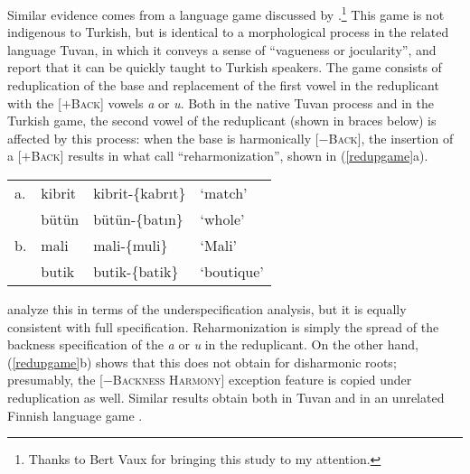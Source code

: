 Similar evidence comes from a language game discussed by \citet{Harrison2001}.\footnote{Thanks to Bert Vaux for bringing this study to my attention.} This game is not indigenous to Turkish, but is identical to a morphological process in the related language Tuvan, in which it conveys a sense of ``vagueness or jocularity'', and \citeauthor{Harrison2001} report that it can be quickly taught to Turkish speakers. The game consists of reduplication of the base and replacement of the first vowel in the reduplicant with the [$+$\textsc{Back}] vowels \emph{a} or \emph{u}. Both in the native Tuvan process and in the Turkish game, the second vowel of the reduplicant (shown in braces below) is affected by this process: when the base is harmonically [$-$\textsc{Back}], the insertion of a [$+$\textsc{Back}] results in what \citeauthor{Harrison2001} call ``reharmonization'', shown in  (\ref{redupgame}a).

\begin{example} \label{redupgame}
\begin{tabular}{l l l l}
a. & {kibrit} & {kibrit}-\{{kabrıt}\} & `match'    \\
   & {bütün}  & {bütün}-\{{batın}\}   & `whole'    \\
b. & {mali}   & {mali}-\{{muli}\}     & `Mali'     \\
   & {butik}  & {butik}-\{{batik}\}   & `boutique' \\
\end{tabular}
\end{example}

\noindent \citeauthor{Harrison2001} analyze this in terms of the \citeauthor{Clements1982} underspecification analysis, but it is equally consistent with full specification. Reharmonization is simply the spread of the backness specification of the \emph{a} or \emph{u} in the reduplicant. On the other hand, (\ref{redupgame}b) shows that this does not obtain for disharmonic roots; presumably, the [$-$\textsc{Backness Harmony}] exception feature is copied under reduplication as well. Similar results obtain both in Tuvan and in an unrelated Finnish language game \citep{Campbell1986}.

